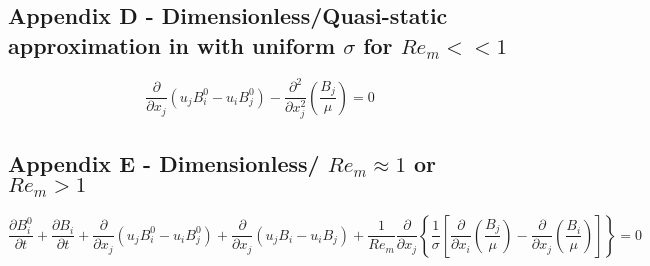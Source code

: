 \documentclass[11pt]{article}
\begin{document}
\subsection{Appendix D - Dimensionless/Quasi-static approximation in with uniform \texorpdfstring{$\sigma$}{LG} for \texorpdfstring{$Re_m<<1$}{LG}}

\begin{equation*}
	\frac{\partial}{\partial x_j} (u_j B_i^0 - u_i B_j^0) 
	- 
	\frac{\partial^2}{\partial x_j^2} 
	\left( \frac{B_j}{\mu} \right) 
	= 
	0
\end{equation*}


\subsection{Appendix E - Dimensionless/ \texorpdfstring{$Re_m \approx 1$ or $Re_m>1$}{LG}}

\begin{equation*}
	\frac{\partial B_i^0}{\partial t}
	+
	\frac{\partial B_i}{\partial t} 
	+ 
	\frac{\partial}{\partial x_j} (u_j B_i^0 - u_i B_j^0) 
	+
	\frac{\partial}{\partial x_j} (u_j B_i - u_i B_j) 
	+ 
	\frac{1}{Re_m}
	\frac{\partial}{\partial x_j} 
	\left\{ \frac{1}{\sigma} 
	\left[ 
	\frac{\partial}{\partial x_i} 
	\left( \frac{B_j}{\mu} \right) 
	- 
	\frac{\partial}{\partial x_j} 
	\left( \frac{B_i}{\mu} \right)
	\right]
	\right\}
	= 
	0
\end{equation*}
\end{document}
